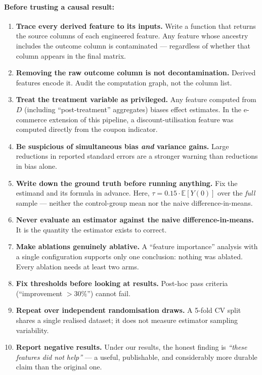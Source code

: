\documentclass[11pt]{article}
\begin{document}
\paragraph{Before trusting a causal result:}
\begin{enumerate}
\item \textbf{Trace every derived feature to its inputs.} Write a function that returns the source columns of each engineered feature. Any feature whose ancestry includes the outcome column is contaminated --- regardless of whether that column appears in the final matrix.
\item \textbf{Removing the raw outcome column is not decontamination.} Derived features encode it. Audit the computation graph, not the column list.
\item \textbf{Treat the treatment variable as privileged.} Any feature computed from $D$ (including ``post-treatment'' aggregates) biases effect estimates. In the e-commerce extension of this pipeline, a discount-utilisation feature was computed directly from the coupon indicator.
\item \textbf{Be suspicious of simultaneous bias \emph{and} variance gains.} Large reductions in reported standard errors are a stronger warning than reductions in bias alone.
\item \textbf{Write down the ground truth before running anything.} Fix the estimand and its formula in advance. Here, $\tau = 0.15 \cdot \mathbb{E}[Y(0)]$ over the \emph{full} sample --- neither the control-group mean nor the naive difference-in-means.
\item \textbf{Never evaluate an estimator against the naive difference-in-means.} It is the quantity the estimator exists to correct.
\item \textbf{Make ablations genuinely ablative.} A ``feature importance'' analysis with a single configuration supports only one conclusion: nothing was ablated. Every ablation needs at least two arms.
\item \textbf{Fix thresholds before looking at results.} Post-hoc pass criteria (``improvement $> 30\%$'') cannot fail.
\item \textbf{Repeat over independent randomisation draws.} A 5-fold CV split shares a single realised dataset; it does not measure estimator sampling variability.
\item \textbf{Report negative results.} Under our results, the honest finding is \emph{``these features did not help''} --- a useful, publishable, and considerably more durable claim than the original one.
\end{enumerate}
\end{document}
